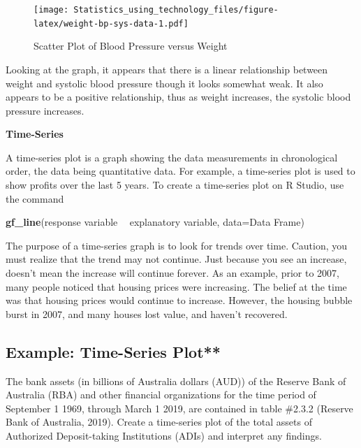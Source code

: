 \documentclass[
]{book}
\newenvironment{Shaded}{\begin{snugshade}}{\end{snugshade}}
\newcommand{\DataTypeTok}[1]{\textcolor[rgb]{0.13,0.29,0.53}{#1}}
\newcommand{\KeywordTok}[1]{\textcolor[rgb]{0.13,0.29,0.53}{\textbf{#1}}}
\newcommand{\NormalTok}[1]{#1}
\newcommand{\OperatorTok}[1]{\textcolor[rgb]{0.81,0.36,0.00}{\textbf{#1}}}
\newcommand{\StringTok}[1]{\textcolor[rgb]{0.31,0.60,0.02}{#1}}
\begin{document}
\begin{figure}
\centering
\texttt{[image: Statistics\_using\_technology\_files/figure-latex/weight-bp-sys-data-1.pdf]}
\caption{\label{fig:weight-bp-sys-data}Scatter Plot of Blood Pressure versus Weight}
\end{figure}

Looking at the graph, it appears that there is a linear relationship between weight and systolic blood pressure though it looks somewhat weak. It also appears to be a positive relationship, thus as weight increases, the systolic blood pressure increases.

\textbf{Time-Series }

A time-series plot is a graph showing the data measurements in chronological order, the data being quantitative data. For example, a time-series plot is used to show profits over the last 5 years. To
create a time-series plot on R Studio, use the command

\begin{Shaded}
\begin{Highlighting}[]
\KeywordTok{gf_line}\NormalTok{(response variable }\OperatorTok{~}\StringTok{ }\NormalTok{explanatory variable, }\DataTypeTok{data=}\NormalTok{Data Frame)}
\end{Highlighting}
\end{Shaded}

The purpose of a time-series graph is to look for trends over time. Caution, you must realize that the trend may not continue. Just because you see an increase, doesn't mean the increase will continue forever. As an example, prior to 2007, many people noticed that housing prices were increasing. The belief at the time was that housing prices would continue to increase. However, the housing bubble burst in 2007, and many houses lost value, and haven't recovered.

\hypertarget{example-time-series-plot}{%
\subsection{Example: Time-Series Plot**}\label{example-time-series-plot}}

The bank assets (in billions of Australia dollars (AUD)) of the Reserve Bank of Australia (RBA) and other financial organizations for the time period of September 1 1969, through March 1 2019, are contained in table \#2.3.2 (Reserve Bank of Australia, 2019). Create a time-series plot of the total assets of Authorized Deposit-taking Institutions (ADIs) and interpret any findings.
\end{document}
